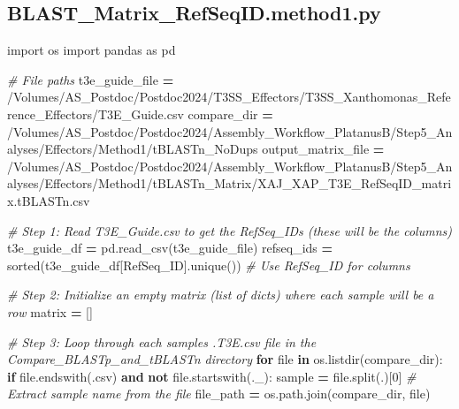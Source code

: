 \documentclass[
]{book}
\newenvironment{Shaded}{\begin{snugshade}}{\end{snugshade}}
\newcommand{\BuiltInTok}[1]{#1}
\newcommand{\CommentTok}[1]{\textcolor[rgb]{0.56,0.35,0.01}{\textit{#1}}}
\newcommand{\ControlFlowTok}[1]{\textcolor[rgb]{0.13,0.29,0.53}{\textbf{#1}}}
\newcommand{\DecValTok}[1]{\textcolor[rgb]{0.00,0.00,0.81}{#1}}
\newcommand{\ImportTok}[1]{#1}
\newcommand{\KeywordTok}[1]{\textcolor[rgb]{0.13,0.29,0.53}{\textbf{#1}}}
\newcommand{\NormalTok}[1]{#1}
\newcommand{\OperatorTok}[1]{\textcolor[rgb]{0.81,0.36,0.00}{\textbf{#1}}}
\newcommand{\StringTok}[1]{\textcolor[rgb]{0.31,0.60,0.02}{#1}}
\begin{document}
\subsection{BLAST\_Matrix\_RefSeqID.method1.py}\label{mxrsmeth1-script}

\begin{Shaded}
\begin{Highlighting}[]
\ImportTok{import}\NormalTok{ os}
\ImportTok{import}\NormalTok{ pandas }\ImportTok{as}\NormalTok{ pd}

\CommentTok{\# File paths}
\NormalTok{t3e\_guide\_file }\OperatorTok{=} \StringTok{\textquotesingle{}/Volumes/AS\_Postdoc/Postdoc2024/T3SS\_Effectors/T3SS\_Xanthomonas\_Reference\_Effectors/T3E\_Guide.csv\textquotesingle{}}
\NormalTok{compare\_dir }\OperatorTok{=} \StringTok{\textquotesingle{}/Volumes/AS\_Postdoc/Postdoc2024/Assembly\_Workflow\_PlatanusB/Step5\_Analyses/Effectors/Method1/tBLASTn\_NoDups\textquotesingle{}}
\NormalTok{output\_matrix\_file }\OperatorTok{=} \StringTok{\textquotesingle{}/Volumes/AS\_Postdoc/Postdoc2024/Assembly\_Workflow\_PlatanusB/Step5\_Analyses/Effectors/Method1/tBLASTn\_Matrix/XAJ\_XAP\_T3E\_RefSeqID\_matrix.tBLASTn.csv\textquotesingle{}}

\CommentTok{\# Step 1: Read T3E\_Guide.csv to get the RefSeq\_IDs (these will be the columns)}
\NormalTok{t3e\_guide\_df }\OperatorTok{=}\NormalTok{ pd.read\_csv(t3e\_guide\_file)}
\NormalTok{refseq\_ids }\OperatorTok{=} \BuiltInTok{sorted}\NormalTok{(t3e\_guide\_df[}\StringTok{\textquotesingle{}RefSeq\_ID\textquotesingle{}}\NormalTok{].unique())  }\CommentTok{\# Use RefSeq\_ID for columns}

\CommentTok{\# Step 2: Initialize an empty matrix (list of dicts) where each sample will be a row}
\NormalTok{matrix }\OperatorTok{=}\NormalTok{ []}

\CommentTok{\# Step 3: Loop through each sample\textquotesingle{}s .T3E.csv file in the Compare\_BLASTp\_and\_tBLASTn directory}
\ControlFlowTok{for} \BuiltInTok{file} \KeywordTok{in}\NormalTok{ os.listdir(compare\_dir):}
    \ControlFlowTok{if} \BuiltInTok{file}\NormalTok{.endswith(}\StringTok{\textquotesingle{}.csv\textquotesingle{}}\NormalTok{) }\KeywordTok{and} \KeywordTok{not} \BuiltInTok{file}\NormalTok{.startswith(}\StringTok{\textquotesingle{}.\_\textquotesingle{}}\NormalTok{):}
\NormalTok{        sample }\OperatorTok{=} \BuiltInTok{file}\NormalTok{.split(}\StringTok{\textquotesingle{}.\textquotesingle{}}\NormalTok{)[}\DecValTok{0}\NormalTok{]  }\CommentTok{\# Extract sample name from the file}
\NormalTok{        file\_path }\OperatorTok{=}\NormalTok{ os.path.join(compare\_dir, }\BuiltInTok{file}\NormalTok{)}
        

\end{Highlighting}
\end{Shaded}
\end{document}

